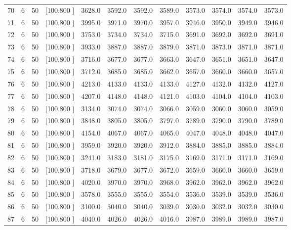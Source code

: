 \documentclass[12pt,a4paper]{article}
\begin{document}
\begin{center}
{\begin{tabular}{r r r r r r r r r r r r}
  70&  6& 50&[100.800   ]&  3628.0&  3592.0&  3592.0&  3589.0&  3573.0&  3574.0&  3574.0&  3573.0\\[-0.02in]
  71&  6& 50&[100.800   ]&  3995.0&  3971.0&  3970.0&  3957.0&  3946.0&  3950.0&  3949.0&  3946.0\\[-0.02in]
  72&  6& 50&[100.800   ]&  3753.0&  3734.0&  3734.0&  3715.0&  3691.0&  3692.0&  3692.0&  3691.0\\[-0.02in]
  73&  6& 50&[100.800   ]&  3933.0&  3887.0&  3887.0&  3879.0&  3871.0&  3873.0&  3871.0&  3871.0\\[-0.02in]
  74&  6& 50&[100.800   ]&  3716.0&  3677.0&  3677.0&  3663.0&  3647.0&  3651.0&  3651.0&  3647.0\\[-0.02in]
  75&  6& 50&[100.800   ]&  3712.0&  3685.0&  3685.0&  3662.0&  3657.0&  3660.0&  3660.0&  3657.0\\[-0.02in]
  76&  6& 50&[100.800   ]&  4213.0&  4133.0&  4133.0&  4133.0&  4127.0&  4132.0&  4132.0&  4127.0\\[-0.02in]
  77&  6& 50&[100.800   ]&  4207.0&  4148.0&  4148.0&  4121.0&  4103.0&  4104.0&  4104.0&  4103.0\\[-0.02in]
  78&  6& 50&[100.800   ]&  3134.0&  3074.0&  3074.0&  3066.0&  3059.0&  3060.0&  3060.0&  3059.0\\[-0.02in]
  79&  6& 50&[100.800   ]&  3848.0&  3805.0&  3805.0&  3797.0&  3789.0&  3790.0&  3790.0&  3789.0\\[-0.02in]
  80&  6& 50&[100.800   ]&  4154.0&  4067.0&  4067.0&  4065.0&  4047.0&  4048.0&  4048.0&  4047.0\\[-0.02in]
  81&  6& 50&[100.800   ]&  3959.0&  3920.0&  3920.0&  3912.0&  3884.0&  3885.0&  3885.0&  3884.0\\[-0.02in]
  82&  6& 50&[100.800   ]&  3241.0&  3183.0&  3181.0&  3175.0&  3169.0&  3171.0&  3171.0&  3169.0\\[-0.02in]
  83&  6& 50&[100.800   ]&  3718.0&  3679.0&  3677.0&  3672.0&  3659.0&  3660.0&  3660.0&  3659.0\\[-0.02in]
  84&  6& 50&[100.800   ]&  4020.0&  3970.0&  3970.0&  3968.0&  3962.0&  3962.0&  3962.0&  3962.0\\[-0.02in]
  85&  6& 50&[100.800   ]&  3578.0&  3555.0&  3555.0&  3554.0&  3536.0&  3539.0&  3539.0&  3536.0\\[-0.02in]
  86&  6& 50&[100.800   ]&  3100.0&  3040.0&  3040.0&  3039.0&  3030.0&  3032.0&  3032.0&  3030.0\\[-0.02in]
  87&  6& 50&[100.800   ]&  4040.0&  4026.0&  4026.0&  4016.0&  3987.0&  3989.0&  3989.0&  3987.0\\[-0.02in]

\end{tabular}}
\end{center}
\end{document}
